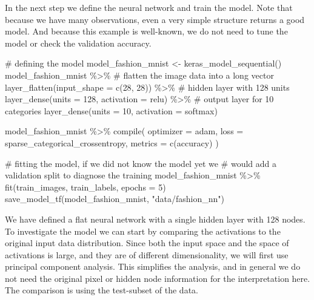 \documentclass[
  letterpaper,
]{krantz}
\newenvironment{Shaded}{\begin{snugshade}}{\end{snugshade}}
\newcommand{\AttributeTok}[1]{\textcolor[rgb]{0.40,0.45,0.13}{#1}}
\newcommand{\CommentTok}[1]{\textcolor[rgb]{0.37,0.37,0.37}{#1}}
\newcommand{\DecValTok}[1]{\textcolor[rgb]{0.68,0.00,0.00}{#1}}
\newcommand{\FunctionTok}[1]{\textcolor[rgb]{0.28,0.35,0.67}{#1}}
\newcommand{\NormalTok}[1]{\textcolor[rgb]{0.00,0.23,0.31}{#1}}
\newcommand{\OtherTok}[1]{\textcolor[rgb]{0.00,0.23,0.31}{#1}}
\newcommand{\SpecialCharTok}[1]{\textcolor[rgb]{0.37,0.37,0.37}{#1}}
\newcommand{\StringTok}[1]{\textcolor[rgb]{0.13,0.47,0.30}{#1}}
\begin{document}
In the next step we define the neural network and train the model. Note
that because we have many observations, even a very simple structure
returns a good model. And because this example is well-known, we do not
need to tune the model or check the validation accuracy.

\begin{Shaded}
\begin{Highlighting}[]
\CommentTok{\# defining the model}
\NormalTok{model\_fashion\_mnist }\OtherTok{\textless{}{-}} \FunctionTok{keras\_model\_sequential}\NormalTok{()}
\NormalTok{model\_fashion\_mnist }\SpecialCharTok{\%\textgreater{}\%}
  \CommentTok{\# flatten the image data into a long vector}
  \FunctionTok{layer\_flatten}\NormalTok{(}\AttributeTok{input\_shape =} \FunctionTok{c}\NormalTok{(}\DecValTok{28}\NormalTok{, }\DecValTok{28}\NormalTok{)) }\SpecialCharTok{\%\textgreater{}\%}
  \CommentTok{\# hidden layer with 128 units}
  \FunctionTok{layer\_dense}\NormalTok{(}\AttributeTok{units =} \DecValTok{128}\NormalTok{, }\AttributeTok{activation =} \StringTok{\textquotesingle{}relu\textquotesingle{}}\NormalTok{) }\SpecialCharTok{\%\textgreater{}\%}
  \CommentTok{\# output layer for 10 categories}
  \FunctionTok{layer\_dense}\NormalTok{(}\AttributeTok{units =} \DecValTok{10}\NormalTok{, }\AttributeTok{activation =} \StringTok{\textquotesingle{}softmax\textquotesingle{}}\NormalTok{)}

\NormalTok{model\_fashion\_mnist }\SpecialCharTok{\%\textgreater{}\%} \FunctionTok{compile}\NormalTok{(}
  \AttributeTok{optimizer =} \StringTok{\textquotesingle{}adam\textquotesingle{}}\NormalTok{,}
  \AttributeTok{loss =} \StringTok{\textquotesingle{}sparse\_categorical\_crossentropy\textquotesingle{}}\NormalTok{,}
  \AttributeTok{metrics =} \FunctionTok{c}\NormalTok{(}\StringTok{\textquotesingle{}accuracy\textquotesingle{}}\NormalTok{)}
\NormalTok{)}

\CommentTok{\# fitting the model, if we did not know the model yet we}
\CommentTok{\# would add a validation split to diagnose the training}
\NormalTok{model\_fashion\_mnist }\SpecialCharTok{\%\textgreater{}\%} \FunctionTok{fit}\NormalTok{(train\_images,}
\NormalTok{              train\_labels,}
              \AttributeTok{epochs =} \DecValTok{5}\NormalTok{)}
\FunctionTok{save\_model\_tf}\NormalTok{(model\_fashion\_mnist, }\StringTok{"data/fashion\_nn"}\NormalTok{)}
\end{Highlighting}
\end{Shaded}

We have defined a flat neural network with a single hidden layer with
128 nodes. To investigate the model we can start by comparing the
activations to the original input data distribution. Since both the
input space and the space of activations is large, and they are of
different dimensionality, we will first use principal component
analysis. This simplifies the analysis, and in general we do not need
the original pixel or hidden node information for the interpretation
here. The comparison is using the test-subset of the data.
\end{document}

